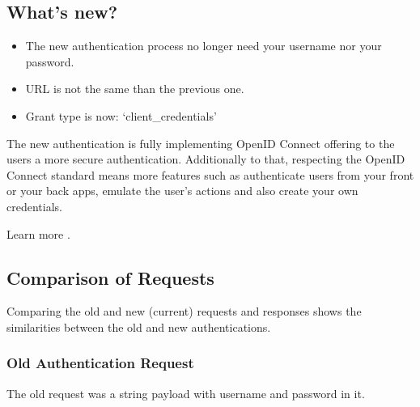 \documentclass[a4paper,12pt,english]{sphinxmanual}
\begin{document}
\subsection{What’s new?}
\label{\detokenize{guide/authentication_migration:what-s-new}}\begin{itemize}
\item {} 
The new authentication process no longer need your username nor your password.

\item {} 
URL is not the same than the previous one.

\item {} 
Grant type is now: ‘client\_credentials’

\end{itemize}

The new authentication is fully implementing OpenID Connect offering to the users a more secure authentication.
Additionally to that, respecting the OpenID Connect standard means more features such as authenticate users from your front or your back apps, emulate the user’s actions and also create your own credentials.

Learn more .


\subsection{Comparison of Requests}
\label{\detokenize{guide/authentication_migration:comparison-of-requests}}
Comparing the old and new (current) requests and responses shows the similarities between the old and new authentications.


\subsubsection{Old Authentication Request}
\label{\detokenize{guide/authentication_migration:old-authentication-request}}
The old request was a string payload with username and password in it.

%
\begin{sphinxVerbatim}[commandchars=\\\{\}]
 
  
  
    
\end{sphinxVerbatim}
\end{document}
